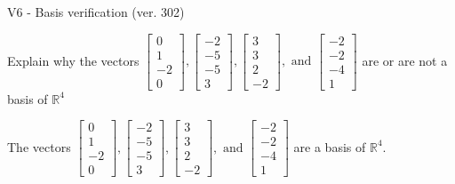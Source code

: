 \begin{exercise}
  \begin{exerciseTitle}V6 - Basis verification (ver. 302)\end{exerciseTitle}
  \begin{exerciseStatement}
    Explain why the vectors \(\left[\begin{array}{r}
0 \\
1 \\
-2 \\
0
\end{array}\right] , \left[\begin{array}{r}
-2 \\
-5 \\
-5 \\
3
\end{array}\right] , \left[\begin{array}{r}
3 \\
3 \\
2 \\
-2
\end{array}\right] , \text{ and } \left[\begin{array}{r}
-2 \\
-2 \\
-4 \\
1
\end{array}\right]\) are or are not a basis of \(\mathbb{R}^4\)	


  \end{exerciseStatement}
  \begin{exerciseAnswer}
   The vectors \(\left[\begin{array}{r}
0 \\
1 \\
-2 \\
0
\end{array}\right] , \left[\begin{array}{r}
-2 \\
-5 \\
-5 \\
3
\end{array}\right] , \left[\begin{array}{r}
3 \\
3 \\
2 \\
-2
\end{array}\right] , \text{ and } \left[\begin{array}{r}
-2 \\
-2 \\
-4 \\
1
\end{array}\right]\) 
  	 are  a basis of \(\mathbb{R}^4\).
  


  \end{exerciseAnswer}
\end{exercise}